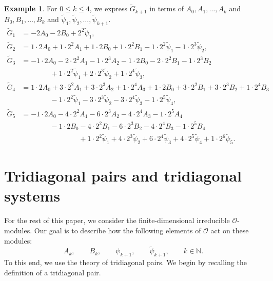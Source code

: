 \documentclass[11pt]{article}%
\theoremstyle{definition}
\newtheorem{example}[definition]{Example}
\theoremstyle{plain}
\begin{document}
\begin{example}
For $0 \leq k \leq 4$, we express $\tilde G_{k+1}$ in terms of $A_0, A_1, \ldots, A_k$ and $B_0, B_1, \ldots, B_{k}$ and $\tilde\psi_1, \tilde\psi_2, \ldots, \tilde\psi_{k+1}$.
\begin{align*}
	\tilde G_1 & = - 2A_0 - 2B_0 + 2^2 \tilde\psi_1, \\[2pt]
	\tilde G_2 & = 1\cdot 2A_0 + 1 \cdot 2^2 A_1 + 1\cdot 2 B_0 + 1\cdot 2^2 B_1 - 1\cdot 2^2 \tilde\psi_1 - 1\cdot 2^3 \tilde\psi_2, \\[2pt]
	\tilde G_3 & = -1\cdot 2 A_0 - 2\cdot2^2 A_1 - 1\cdot 2^3 A_2 
			- 1 \cdot 2 B_0 - 2 \cdot 2^2 B_1 - 1\cdot 2^3 B_2 \\[2pt]
	& \qquad \qquad + 1 \cdot 2^2 \tilde\psi_1 + 2 \cdot 2^3 \tilde\psi_2 + 1 \cdot 2^4\tilde\psi_3, \\[2pt]
	\tilde G_4 & = 1 \cdot 2 A_0 + 3 \cdot 2^2 A_1 + 3 \cdot 2^3 A_2 + 1\cdot 2^4 A_3
			+ 1 \cdot 2 B_0 + 3 \cdot 2^2 B_1 + 3 \cdot 2^3 B_2 + 1\cdot 2^4 B_3 \\[2pt]
	& \qquad \qquad	
			- 1 \cdot 2^2 \tilde\psi_1 - 3 \cdot 2^3 \tilde\psi_2 - 3 \cdot 2^4 \tilde\psi_3 - 1\cdot 2^5 \tilde\psi_4, \\[2pt]
	\tilde G_5 & = -1 \cdot 2 A_0 - 4 \cdot 2^2 A_1 - 6 \cdot 2^3 A_2 - 4 \cdot 2^4 A_3 - 1 \cdot 2^5 A_4 \\[2pt]
			& \qquad \qquad -1 \cdot 2 B_0 - 4 \cdot 2^2 B_1 - 6 \cdot 2^3 B_2 - 4 \cdot 2^4 B_3 - 1 \cdot 2^5 B_4\\[2pt]
	& \qquad \qquad \qquad \qquad
			+ 1 \cdot 2^2 \tilde\psi_1 + 4 \cdot 2^3 \tilde\psi_2 + 6 \cdot 2^4 \tilde\psi_3 + 4 \cdot 2^5 \tilde\psi_4 + 1 \cdot 2^6 \tilde\psi_5.
\end{align*}

\end{example}





\section{Tridiagonal pairs and tridiagonal systems}\label{Sec:TD_pair}

For the rest of this paper, we consider the finite-dimensional irreducible $\mathcal{O}$-modules.
Our goal is to describe how the following elements of $\mathcal{O}$ act on these modules:
\begin{equation}\label{eq:module elements}
	A_k, \qquad B_k, \qquad \psi_{k+1}, \qquad \tilde\psi_{k+1}, \qquad k\in\mathbb{N}.
\end{equation}
To this end, we use the theory of tridiagonal pairs.
We begin by recalling the definition of a tridiagonal pair.
\end{document}
